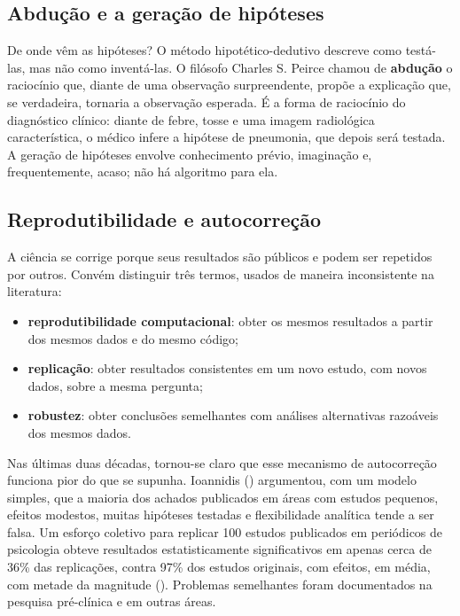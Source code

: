 \documentclass[
]{book}
\providecommand{\tightlist}{%
  \setlength{\itemsep}{0pt}\setlength{\parskip}{0pt}}
\begin{document}
\subsection{Abdução e a geração de hipóteses}\label{abduuxe7uxe3o-e-a-gerauxe7uxe3o-de-hipuxf3teses}

De onde vêm as hipóteses? O método hipotético-dedutivo descreve como testá-las, mas não como inventá-las. O filósofo Charles S. Peirce chamou de \textbf{abdução} o raciocínio que, diante de uma observação surpreendente, propõe a explicação que, se verdadeira, tornaria a observação esperada. É a forma de raciocínio do diagnóstico clínico: diante de febre, tosse e uma imagem radiológica característica, o médico infere a hipótese de pneumonia, que depois será testada. A geração de hipóteses envolve conhecimento prévio, imaginação e, frequentemente, acaso; não há algoritmo para ela.

\subsection{Reprodutibilidade e autocorreção}\label{reprodutibilidade-e-autocorreuxe7uxe3o}

A ciência se corrige porque seus resultados são públicos e podem ser repetidos por outros. Convém distinguir três termos, usados de maneira inconsistente na literatura:

\begin{itemize}
\tightlist
\item
  \textbf{reprodutibilidade computacional}: obter os mesmos resultados a partir dos mesmos dados e do mesmo código;
\item
  \textbf{replicação}: obter resultados consistentes em um novo estudo, com novos dados, sobre a mesma pergunta;
\item
  \textbf{robustez}: obter conclusões semelhantes com análises alternativas razoáveis dos mesmos dados.
\end{itemize}

Nas últimas duas décadas, tornou-se claro que esse mecanismo de autocorreção funciona pior do que se supunha. Ioannidis () argumentou, com um modelo simples, que a maioria dos achados publicados em áreas com estudos pequenos, efeitos modestos, muitas hipóteses testadas e flexibilidade analítica tende a ser falsa. Um esforço coletivo para replicar 100 estudos publicados em periódicos de psicologia obteve resultados estatisticamente significativos em apenas cerca de 36\% das replicações, contra 97\% dos estudos originais, com efeitos, em média, com metade da magnitude (). Problemas semelhantes foram documentados na pesquisa pré-clínica e em outras áreas.
\end{document}
